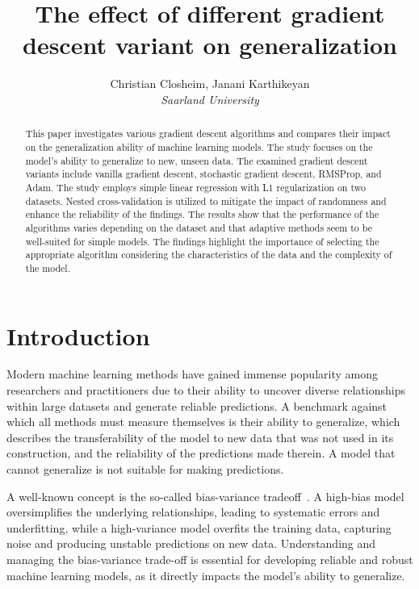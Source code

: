 \documentclass[10pt,conference,compsocconf]{IEEEtran}
\begin{document}
\title{The effect of different gradient descent variant on generalization}

\author{
  Christian Closheim, Janani Karthikeyan\\
  \textit{Saarland University}
}
\maketitle

\begin{abstract}
This paper investigates various gradient descent algorithms and compares their impact on the generalization ability of machine learning models. 
The study focuses on the model's ability to generalize to new, unseen data. 
The examined gradient descent variants include vanilla gradient descent, stochastic gradient descent, RMSProp, and Adam. 
The study employs simple linear regression with L1 regularization on two datasets. 
Nested cross-validation is utilized to mitigate the impact of randomness and enhance the reliability of the findings. 
The results show that the performance of the algorithms varies depending on the dataset and that adaptive methods seem to be well-suited for simple models. 
The findings highlight the importance of selecting the appropriate algorithm considering the characteristics of the data and the complexity of the model. 
\end{abstract}

\section{Introduction}

Modern machine learning methods have gained immense popularity among researchers and practitioners due to their ability to uncover diverse relationships within large datasets and generate reliable predictions.
A benchmark against which all methods must measure themselves is their ability to generalize, which describes the transferability of the model to new data that was not used in its construction, and the reliability of the predictions made therein. 
A model that cannot generalize is not suitable for making predictions.

A well-known concept is the so-called bias-variance tradeoff~\cite{elements_of_statistical_learning}. 
A high-bias model oversimplifies the underlying relationships, leading to systematic errors and underfitting, while a high-variance model overfits the training data, capturing noise and producing unstable predictions on new data.
Understanding and managing the bias-variance trade-off is essential for developing reliable and robust machine learning models, as it directly impacts the model's ability to generalize.
\end{document}
